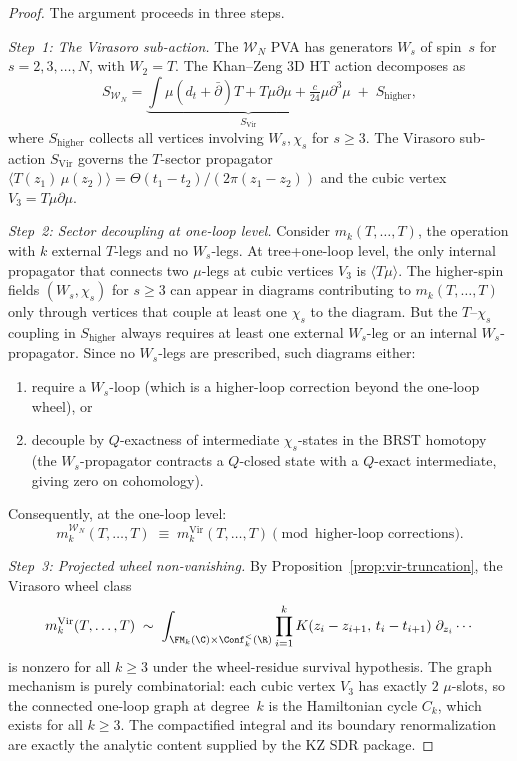 \begin{proof}
The argument proceeds in three steps.

\medskip
\emph{Step~1: The Virasoro sub-action.}
The $\mathcal{W}_N$ PVA has generators $W_s$ of spin~$s$ for
$s = 2, 3, \ldots, N$, with $W_2 = T$. The Khan--Zeng 3D HT action
decomposes as
\[
S_{\mathcal{W}_N}
= \underbrace{\int \mu(d_t + \bar\partial)T + T\mu\partial\mu
 + \tfrac{c}{24}\mu\partial^3\mu}_{S_{\mathrm{Vir}}}
\;+\; S_{\mathrm{higher}},
\]
where $S_{\mathrm{higher}}$ collects all vertices involving
$W_s, \chi_s$ for $s \ge 3$. The Virasoro sub-action
$S_{\mathrm{Vir}}$ governs the $T$-sector propagator
$\langle T(z_1)\,\mu(z_2) \rangle = \Theta(t_1-t_2)/(2\pi(z_1-z_2))$
and the cubic vertex $V_3 = T\mu\partial\mu$.

\medskip
\emph{Step~2: Sector decoupling at one-loop level.}
Consider $m_k(T, \ldots, T)$, the operation with $k$ external
$T$-legs and no $W_s$-legs. At tree+one-loop level, the only
internal propagator that connects two $\mu$-legs at cubic
vertices $V_3$ is $\langle T\mu \rangle$. The higher-spin fields
$(W_s, \chi_s)$ for $s \ge 3$ can appear in diagrams contributing
to $m_k(T, \ldots, T)$ only through vertices that couple at least
one $\chi_s$ to the diagram. But the $T$--$\chi_s$ coupling in
$S_{\mathrm{higher}}$ always requires at least one external
$W_s$-leg or an internal $W_s$-propagator. Since no $W_s$-legs
are prescribed, such diagrams either:
\begin{enumerate}[label=(\alph*)]
\item require a $W_s$-loop (which is a higher-loop correction
 beyond the one-loop wheel), or
\item decouple by $Q$-exactness of intermediate $\chi_s$-states
 in the BRST homotopy (the $W_s$-propagator contracts a
 $Q$-closed state with a $Q$-exact intermediate, giving zero
 on cohomology).
\end{enumerate}
Consequently, at the one-loop level:
\begin{equation}
\label{eq:wn-sector-decoupling}
m_k^{\mathcal{W}_N}(T, \ldots, T)
\;\equiv\; m_k^{\mathrm{Vir}}(T, \ldots, T)
\pmod{\text{higher-loop corrections}}.
\end{equation}

\medskip
\emph{Step~3: Projected wheel non-vanishing.}
By Proposition~\ref{prop:vir-truncation}, the Virasoro wheel class
\[
m_k^{\mathrm{Vir}}(T, \ldots, T)
\;\sim\; \int_{\FM_k(\C) \times \Conf_k^{<}(\R)}
 \prod_{i=1}^k K(z_i - z_{i+1},\, t_i - t_{i+1})\;
 \partial_{z_i}\cdots
\]
is nonzero for all $k \ge 3$ under the wheel-residue survival
hypothesis. The graph mechanism is purely combinatorial: each cubic
vertex $V_3$ has exactly $2$ $\mu$-slots, so the connected one-loop
graph at degree~$k$ is the Hamiltonian cycle $C_k$, which exists for
all $k \ge 3$. The compactified integral and its boundary
renormalization are exactly the analytic content supplied by the KZ SDR
package.


\end{proof}
